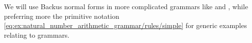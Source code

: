 \begin{comments}
  \item We will use Backus normal forms in more complicated grammars like  and , while preferring more the primitive notation \eqref{eq:ex:natural_number_arithmetic_grammar/rules/simple} for generic examples relating to grammars.
\end{comments}
